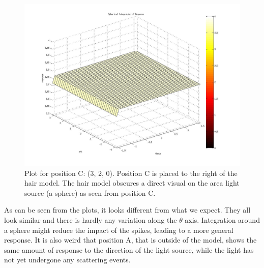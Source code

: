 \documentclass[11pt,a4paper]{article}
\begin{document}
\begin{figure}
\begin{center}
\includegraphics[scale=0.3]{outputC.jpg}
\caption{Plot for position C: (3, 2, 0). Position C is placed to the right of the hair model. The hair model obscures a direct visual on the area light source (a sphere) as seen from position C.}
\end{center}
\end{figure}


As can be seen from the plots, it looks different from what we expect. They all look similar and there is hardly any variation along the $\theta$ axis. Integration around a sphere might reduce the impact of the spikes, leading to a more general response. It is also weird that position A, that is outside of the model, shows the same amount of response to the direction of the light source, while the light has not yet undergone any scattering events.
\end{document}
